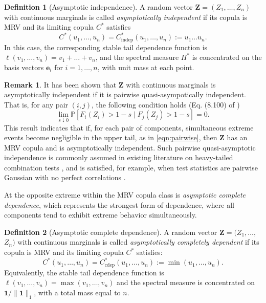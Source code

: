 \documentclass[12pt]{article}
\theoremstyle{plain}
\theoremstyle{plain}
\theoremstyle{definition}
\newtheorem{defn}{Definition}[section]
\newtheorem{rem}{Remark}[section]
\renewcommand{\Pr}{\mathbb{P}}
\begin{document}
\begin{defn}[Asymptotic independence]
\label{def:asymptotic-independence}
A random vector $\mathbf{Z}=(Z_1,\dots,Z_n)$ with continuous marginals is called \emph{asymptotically independent} 
if its copula is MRV and its limiting copula $C^*$ satisfies
\begin{equation}
\label{eq:define-indep-copula}
  C^* (u_1,\dots,u_n) =   C^*_{\mathrm{indep}}(u_1,\dots,u_n):=u_1\dots u_n.
\end{equation}
In this case, the corresponding stable tail dependence function is $\ell(v_1, \dots, v_n) = v_1 + \dots +v_n$, and the spectral measure $H^*$ is concentrated on the basis vectors $\mathbf{e}_i$ for $i = 1, \dots, n$, with unit mass at each point. 
\end{defn}


\begin{rem}
It has been shown that $\mathbf Z$ with continuous marginals is asymptotically independent if it is pairwise quasi-asympotically independent. That is, for any pair $(i,j)$, the following condition holds (Eq. (8.100) of \cite{beirlant2006statistics})
\begin{equation}
\label{eqn:pairwise}
    \lim_{s\downarrow0}\Pr[F_i(Z_i)>1-s\mid F_j(Z_j)>1-s]=0.
\end{equation}
This result indicates that if, for each pair of components, simultaneous extreme events become negligible in the upper tail, as in \eqref{eqn:pairwise}, then $\mathbf Z$ has an MRV copula and is asymptotically independent. Such pairwise quasi-asymptotic independence is commonly assumed in existing literature on heavy-tailed combination tests \citep{liu2020cauchy,fang2023heavy,gui2023aggregating}, and is satisfied, for example, when test statistics are pairwise Gaussian with no perfect correlations \citep{gui2023aggregating}.
\end{rem}

At the opposite extreme within the MRV copula class is \emph{asymptotic complete dependence}, which represents the strongest form of dependence, where all components tend to exhibit extreme behavior simultaneously.

\begin{defn}[Asymptotic complete dependence]
\label{def:asymptotic-complete-dependence}
A random vector $\mathbf{Z}=(Z_1,\dots,$ $Z_n)$ with continuous marginals
is called \emph{asymptotically completely dependent} if its copula is MRV and its limiting copula $C^*$ satisfies:
\begin{equation}
\label{eq:define-asymp-fully-dep}
   C^*(u_1,\dots,u_n) = C^*_{\mathrm{cdep}}(u_1,\dots,u_n):=\min(u_1,\dots,u_n).
\end{equation}
Equivalently, the stable tail dependence function is $\ell(v_1, \dots,v_n)=\max(v_1,\dots,v_n)$ and the spectral measure is concentrated on $\mathbf{1}/\|\mathbf{1}\|_1$, with a total mass equal to $n$.
\end{defn}
\end{document}
